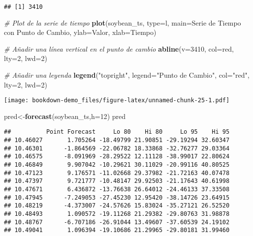 \documentclass[
]{book}
\newenvironment{Shaded}{\begin{snugshade}}{\end{snugshade}}
\newcommand{\AttributeTok}[1]{\textcolor[rgb]{0.13,0.29,0.53}{#1}}
\newcommand{\CommentTok}[1]{\textcolor[rgb]{0.56,0.35,0.01}{\textit{#1}}}
\newcommand{\DecValTok}[1]{\textcolor[rgb]{0.00,0.00,0.81}{#1}}
\newcommand{\FunctionTok}[1]{\textcolor[rgb]{0.13,0.29,0.53}{\textbf{#1}}}
\newcommand{\NormalTok}[1]{#1}
\newcommand{\OtherTok}[1]{\textcolor[rgb]{0.56,0.35,0.01}{#1}}
\newcommand{\StringTok}[1]{\textcolor[rgb]{0.31,0.60,0.02}{#1}}
\begin{document}
\begin{verbatim}
## [1] 3410
\end{verbatim}

\begin{Shaded}
\begin{Highlighting}[]
\CommentTok{\# Plot de la serie de tiempo}
\FunctionTok{plot}\NormalTok{(soybean\_ts, }\AttributeTok{type=}\StringTok{\textquotesingle{}l\textquotesingle{}}\NormalTok{, }\AttributeTok{main=}\StringTok{\textquotesingle{}Serie de Tiempo con Punto de Cambio\textquotesingle{}}\NormalTok{, }\AttributeTok{ylab=}\StringTok{\textquotesingle{}Valor\textquotesingle{}}\NormalTok{, }\AttributeTok{xlab=}\StringTok{\textquotesingle{}Tiempo\textquotesingle{}}\NormalTok{)}

\CommentTok{\# Añadir una línea vertical en el punto de cambio}
\FunctionTok{abline}\NormalTok{(}\AttributeTok{v=}\DecValTok{3410}\NormalTok{, }\AttributeTok{col=}\StringTok{\textquotesingle{}red\textquotesingle{}}\NormalTok{, }\AttributeTok{lty=}\DecValTok{2}\NormalTok{, }\AttributeTok{lwd=}\DecValTok{2}\NormalTok{)}

\CommentTok{\# Añadir una leyenda}
\FunctionTok{legend}\NormalTok{(}\StringTok{"topright"}\NormalTok{, }\AttributeTok{legend=}\StringTok{"Punto de Cambio"}\NormalTok{, }\AttributeTok{col=}\StringTok{"red"}\NormalTok{, }\AttributeTok{lty=}\DecValTok{2}\NormalTok{, }\AttributeTok{lwd=}\DecValTok{2}\NormalTok{)}
\end{Highlighting}
\end{Shaded}

\texttt{[image: bookdown-demo\_files/figure-latex/unnamed-chunk-25-1.pdf]}

\begin{Shaded}
\begin{Highlighting}[]
\NormalTok{pred}\OtherTok{\textless{}{-}}\FunctionTok{forecast}\NormalTok{(soybean\_ts,}\AttributeTok{h=}\DecValTok{12}\NormalTok{)}
\NormalTok{pred}
\end{Highlighting}
\end{Shaded}

\begin{verbatim}
##          Point Forecast     Lo 80    Hi 80     Lo 95    Hi 95
## 10.46027       1.705264 -18.49799 21.90851 -29.19294 32.60347
## 10.46301      -1.864569 -22.06782 18.33868 -32.76277 29.03364
## 10.46575      -8.091969 -28.29522 12.11128 -38.99017 22.80624
## 10.46849       9.907042 -10.29621 30.11029 -20.99116 40.80525
## 10.47123       9.176571 -11.02668 29.37982 -21.72163 40.07478
## 10.47397       9.721777 -10.48147 29.92503 -21.17643 40.61998
## 10.47671       6.436872 -13.76638 26.64012 -24.46133 37.33508
## 10.47945      -7.249053 -27.45230 12.95420 -38.14726 23.64915
## 10.48219      -4.373007 -24.57626 15.83024 -35.27121 26.52520
## 10.48493       1.090572 -19.11268 21.29382 -29.80763 31.98878
## 10.48767      -6.707186 -26.91044 13.49607 -37.60539 24.19102
## 10.49041       1.096394 -19.10686 21.29965 -29.80181 31.99460
\end{verbatim}
\end{document}

